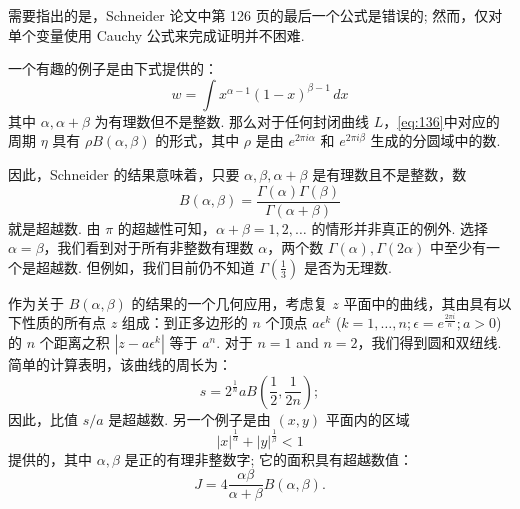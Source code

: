 需要指出的是，Schneider 论文中第 126 页的最后一个公式是错误的; 然而，仅对单个变量使用 Cauchy 公式来完成证明并不困难.

一个有趣的例子是由下式提供的：
\[
w = \int x^{\alpha-1} (1-x)^{\beta-1} \, dx
\]
其中 $\alpha, \alpha+\beta$ 为有理数但不是整数. 那么对于任何封闭曲线 $L$，\eqref{eq:136}中对应的周期 $\eta$ 具有 $\rho B(\alpha, \beta)$ 的形式，其中 $\rho$ 是由 $e^{2\pi i \alpha}$ 和 $e^{2\pi i \beta}$ 生成的分圆域中的数.

因此，Schneider 的结果意味着，只要 $\alpha, \beta, \alpha+\beta$ 是有理数且不是整数，数
\[
B(\alpha, \beta) = \frac{\Gamma(\alpha)\Gamma(\beta)}{\Gamma(\alpha+\beta)}
\]
就是超越数. 由 $\pi$ 的超越性可知，$\alpha+\beta = 1, 2, \dots$ 的情形并非真正的例外. 选择 $\alpha = \beta$，我们看到对于所有非整数有理数 $\alpha$，两个数 $\Gamma(\alpha), \Gamma(2\alpha)$ 中至少有一个是超越数. 但例如，我们目前仍不知道 $\Gamma(\frac{1}{3})$ 是否为无理数.

作为关于 $B(\alpha, \beta)$ 的结果的一个几何应用，考虑复 $z$ 平面中的曲线，其由具有以下性质的所有点 $z$ 组成：到正多边形的 $n$ 个顶点 $a \epsilon^k$ ($k=1, \dots, n; \epsilon = e^{\frac{2\pi i}{n}}; a > 0$) 的 $n$ 个距离之积 $|z - a \epsilon^k|$ 等于 $a^n$. 对于 $n=1$ and $n=2$，我们得到圆和双纽线. 简单的计算表明，该曲线的周长为：
\[
s = 2^{\frac{1}{n}} a B\left(\frac{1}{2}, \frac{1}{2n}\right);
\]
因此，比值 $s/a$ 是超越数. 另一个例子是由 $(x,y)$ 平面内的区域
\[
|x|^{\frac{1}{\alpha}} + |y|^{\frac{1}{\beta}} < 1
\]
提供的，其中 $\alpha, \beta$ 是正的有理非整数字; 它的面积具有超越数值：
\[
J = 4 \frac{\alpha \beta}{\alpha + \beta} B(\alpha, \beta).
\]